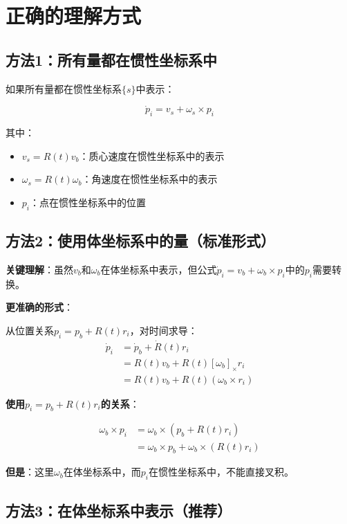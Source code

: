 \documentclass[12pt,a4paper]{article}
\begin{document}
\section{正确的理解方式}

\subsection{方法1：所有量都在惯性坐标系中}

如果所有量都在惯性坐标系$\{s\}$中表示：

\begin{equation}
\dot{p}_i = v_s + \omega_s \times p_i
\end{equation}

其中：
\begin{itemize}
\item $v_s = R(t) v_b$：质心速度在惯性坐标系中的表示
\item $\omega_s = R(t) \omega_b$：角速度在惯性坐标系中的表示
\item $p_i$：点在惯性坐标系中的位置
\end{itemize}

\subsection{方法2：使用体坐标系中的量（标准形式）}

\textbf{关键理解}：虽然$v_b$和$\omega_b$在体坐标系中表示，但公式$\dot{p}_i = v_b + \omega_b \times p_i$中的$p_i$需要转换。

\textbf{更准确的形式}：

从位置关系$p_i = p_b + R(t) r_i$，对时间求导：
\begin{align}
\dot{p}_i &= \dot{p}_b + \dot{R}(t) r_i \\
&= R(t) v_b + R(t) [\omega_b]_{\times} r_i \\
&= R(t) v_b + R(t) (\omega_b \times r_i)
\end{align}

\textbf{使用$p_i = p_b + R(t) r_i$的关系}：

\begin{align}
\omega_b \times p_i &= \omega_b \times (p_b + R(t) r_i) \\
&= \omega_b \times p_b + \omega_b \times (R(t) r_i)
\end{align}

\textbf{但是}：这里$\omega_b$在体坐标系中，而$p_i$在惯性坐标系中，不能直接叉积。

\subsection{方法3：在体坐标系中表示（推荐）}
\end{document}
